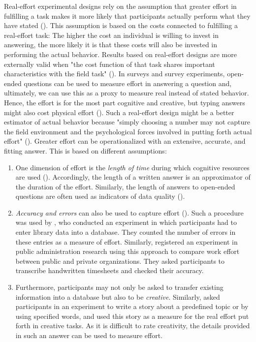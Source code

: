 \documentclass[twocolumn, issue, empirical, authordate]{jote-new-article}
\begin{document}
Real-effort experimental designs rely on the assumption that greater effort in fulfilling a task makes it more likely that participants actually perform what they have stated (). This assumption is based on the costs connected to fulfilling a real-effort task: The higher the cost an individual is willing to invest in answering, the more likely it is that these costs will also be invested in performing the actual behavior. Results based on real-effort designs are more externally valid when "the cost function of that task shares important characteristics with the field task" (). In surveys and survey experiments, open-ended questions can be used to measure effort in answering a question and, ultimately, we can use this as a proxy to measure real instead of stated behavior. Hence, the effort is for the most part cognitive and creative, but typing answers might also cost physical effort (). Such a real-effort design might be a better estimator of actual behavior because "simply choosing a number may not capture the field environment and the psychological forces involved in putting forth actual effort" (). Greater effort can be operationalized with an extensive, accurate, and fitting answer. This is based on different assumptions: \begin{enumerate} \def\labelenumi{\arabic{enumi}.} \item One dimension of effort is the \emph{length of time} during which cognitive resources are used ().
 Accordingly, the length of a written answer is an approximator of the duration of the effort. Similarly, the length of answers to open-ended questions are often used as indicators of data quality ().
\item \emph{Accuracy and errors} can also be used to capture effort (). Such a procedure was used by \textcite{Gneezy2006}, who conducted an experiment in which participants had to enter library data into a database. They counted the number of errors in these entries as a measure of effort. Similarly, \textcite{Andersen2018} registered an experiment in public administration research using this approach to compare work effort between public and private organizations. They asked participants to transcribe handwritten timesheets and checked their accuracy.
\item Furthermore, participants may not only be asked to transfer existing information into a database but also to be \emph{creative}. Similarly, \textcite{Charness2018} asked participants in an experiment to write a story about a predefined topic or by using specified words, and used this story as a measure for the real effort put forth in creative tasks. As it is difficult to rate creativity, the details provided in such an answer can be used to measure effort.
\end{enumerate} 
\end{document}
